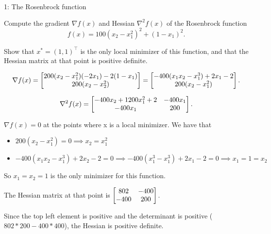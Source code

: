 
\begin{problem}{1: The Rosenbrock function}

Compute the gradient $\nabla f(x)$ and Hessian $\nabla ^2 f(x)$ of the Rosenbrock function
\[
  f(x) = 100(x_2 - x_1^2)^2+ (1-x_1)^2
.\] 

Show that $x^* = (1,1)^{\top}$ is the only local minimizer of this function, and that the Hessian matrix at that point 
is positive definite. 

\end{problem}


\[
  \nabla f(x) = \begin{bmatrix} 200(x_2-x_1^2)(-2x_1)-2(1-x_1) \\ 200(x_2-x_2^2) \end{bmatrix} = \begin{bmatrix} -400(x_1x_2-x_1^3) + 2x_1-2 \\ 200(x_2-x_1^2) \end{bmatrix}
.\] 

\[
  \nabla ^2 f(x) = \begin{bmatrix} -400x_2+1200x_1^2+2 & -400x_1 \\ -400x_1 & 200 \end{bmatrix}
.\] 

$\nabla f(x) = 0$ at the points where x is a local minimizer. We have that
\begin{itemize}
  \item $200(x_2-x_1^2) = 0 \implies x_2 = x_1^2$
  \item $-400(x_1x_2-x_1^3) + 2x_2 - 2 = 0 \implies -400(x_1^3 - x_1^3) + 2x_1 - 2 = 0 \implies x_1 = 1 = x_2$
\end{itemize}

So $x_1 = x_2 = 1$ is the only minimizer for this function. 

The Hessian matrix at that point is $\begin{bmatrix} 802 & -400 \\ -400  & 200 \end{bmatrix}$. 

Since the top left element is positive and the determinant is positive ($802*200-400*400$), the Hessian is positive definite. 

